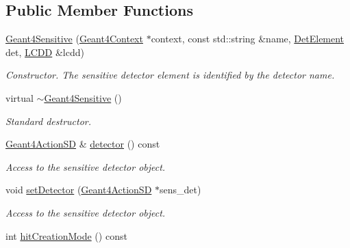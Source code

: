 \subsection*{Public Member Functions}
\begin{DoxyCompactItemize}
\item 
\hyperlink{class_d_d4hep_1_1_simulation_1_1_geant4_sensitive_a906ab36a3a6b09cd5ad01afb6d21fdfe}{Geant4Sensitive} (\hyperlink{class_d_d4hep_1_1_simulation_1_1_geant4_context}{Geant4Context} $\ast$context, const std::string \&name, \hyperlink{class_d_d4hep_1_1_geometry_1_1_det_element}{DetElement} det, \hyperlink{class_d_d4hep_1_1_geometry_1_1_l_c_d_d}{LCDD} \&lcdd)
\begin{DoxyCompactList}\small\item\em Constructor. The sensitive detector element is identified by the detector name. \item\end{DoxyCompactList}\item 
virtual \hyperlink{class_d_d4hep_1_1_simulation_1_1_geant4_sensitive_ada2869ec6bcb9674eaa29f7e1c215729}{$\sim$Geant4Sensitive} ()
\begin{DoxyCompactList}\small\item\em Standard destructor. \item\end{DoxyCompactList}\item 
\hyperlink{class_d_d4hep_1_1_simulation_1_1_geant4_action_s_d}{Geant4ActionSD} \& \hyperlink{class_d_d4hep_1_1_simulation_1_1_geant4_sensitive_addca9fecaf087a7ce495960cae4cc8cc}{detector} () const 
\begin{DoxyCompactList}\small\item\em Access to the sensitive detector object. \item\end{DoxyCompactList}\item 
void \hyperlink{class_d_d4hep_1_1_simulation_1_1_geant4_sensitive_aac4f3a911f3818516bfb54a5b2bbef39}{setDetector} (\hyperlink{class_d_d4hep_1_1_simulation_1_1_geant4_action_s_d}{Geant4ActionSD} $\ast$sens\_\-det)
\begin{DoxyCompactList}\small\item\em Access to the sensitive detector object. \item\end{DoxyCompactList}\item 
int \hyperlink{class_d_d4hep_1_1_simulation_1_1_geant4_sensitive_a5989fb84f6cf345de35d877f637c5b8d}{hitCreationMode} () const 

\end{DoxyCompactItemize}

